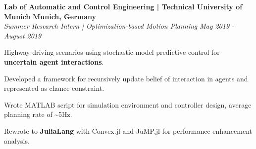 \headerrow
    {\textbf{Lab of Automatic and Control Engineering | Technical University of Munich}}
    {\textbf{Munich, Germany}}
\\
\headerrow
    {\emph{Summer Research Intern | Optimization-based Motion Planning}}
    {\emph{May 2019 - August 2019}}
    
\begin{itemize*}
    \item Highway driving scenarios using stochastic model predictive control for \textbf{uncertain agent interactions}.
    \item Developed a framework for recursively update belief of interaction in agents and represented as chance-constraint.
    \item Wrote MATLAB script for simulation environment and controller design, average planning rate of \textasciitilde5Hz.
    \item Rewrote to \textbf{JuliaLang} with Convex.jl and JuMP.jl for performance enhancement analysis.
\end{itemize*}